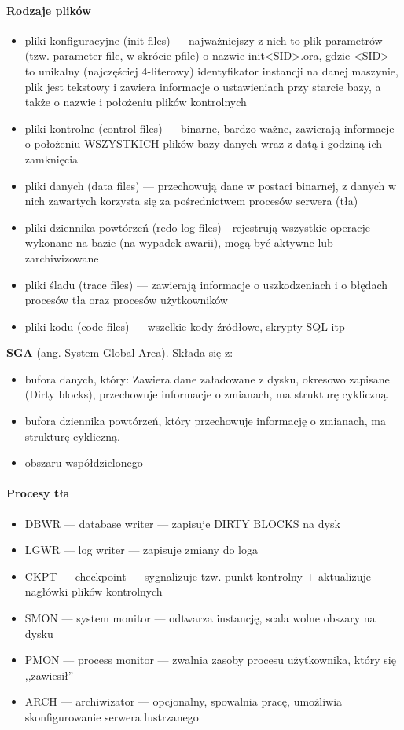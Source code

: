 \documentclass[a4paper,twoside]{report}
\begin{document}
\medskip 
\paragraph{Rodzaje plików}

\begin{itemize}
\item pliki konfiguracyjne (init files) — najważniejszy z nich to plik parametrów (tzw. parameter file, w skrócie pfile) o nazwie init<SID>.ora, gdzie <SID> to unikalny (najczęściej 4-literowy) identyfikator instancji na danej maszynie, plik jest tekstowy i zawiera informacje o ustawieniach przy starcie bazy, a także o nazwie i położeniu plików kontrolnych
\item pliki kontrolne (control files) — binarne, bardzo ważne, zawierają informacje o położeniu WSZYSTKICH plików bazy danych wraz z datą i godziną ich zamknięcia
\item pliki danych (data files) — przechowują dane w postaci binarnej, z danych w nich zawartych korzysta się za pośrednictwem procesów serwera (tła)
\item  pliki dziennika powtórzeń (redo-log files) - rejestrują wszystkie operacje wykonane na bazie (na wypadek awarii), mogą być aktywne lub zarchiwizowane 
\item pliki śladu (trace files) — zawierają informacje o uszkodzeniach i o błędach procesów tła oraz procesów użytkowników
\item pliki kodu (code files) — wszelkie kody źródłowe, skrypty SQL itp 
\end{itemize}


\textbf{SGA} (ang. System Global Area). 
Składa się z:
\begin{itemize}
\item bufora danych, który:
Zawiera dane załadowane z dysku, okresowo zapisane (Dirty blocks), przechowuje informacje o zmianach, ma strukturę cykliczną.
\item bufora dziennika powtórzeń, który przechowuje informację o zmianach, ma strukturę cykliczną.
\item obszaru współdzielonego
\end{itemize}

\paragraph{Procesy tła}
\begin{itemize}
\item DBWR — database writer — zapisuje DIRTY BLOCKS na dysk 
\item LGWR — log writer — zapisuje zmiany do loga
\item CKPT — checkpoint — sygnalizuje tzw. punkt kontrolny + aktualizuje nagłówki plików kontrolnych
\item SMON — system monitor — odtwarza instancję, scala wolne obszary na dysku
\item PMON — process monitor — zwalnia zasoby procesu użytkownika, który się ,,zawiesił''
\item ARCH — archiwizator — opcjonalny, spowalnia pracę, umożliwia skonfigurowanie serwera lustrzanego
\end{itemize}
\end{document}
